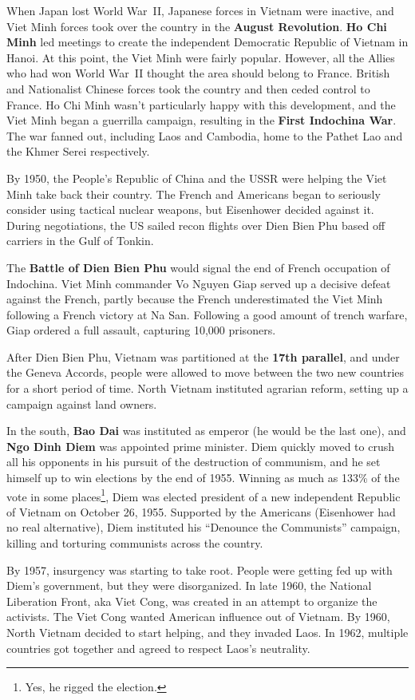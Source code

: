 When Japan lost World War~II, Japanese forces in Vietnam were inactive,
and Viet Minh forces took over the country in the \textbf{August Revolution}.
\textbf{Ho Chi Minh} led meetings to create the independent Democratic Republic of Vietnam in Hanoi.
At this point, the Viet Minh were fairly popular.
However, all the Allies who had won World War~II thought the area should belong to France.
British and Nationalist Chinese forces took the country and then ceded control to France.
Ho Chi Minh wasn't particularly happy with this development,
and the Viet Minh began a guerrilla campaign, resulting in the \textbf{First Indochina War}.
The war fanned out, including Laos and Cambodia, home to the Pathet Lao and the Khmer Serei respectively.

By 1950, the People's Republic of China and the USSR were helping the Viet Minh take back their country.
The French and Americans began to seriously consider using tactical nuclear weapons,
but Eisenhower decided against it.
During negotiations, the US sailed recon flights over Dien Bien Phu based off carriers in the Gulf of Tonkin.

The \textbf{Battle of Dien Bien Phu} would signal the end of French occupation of Indochina.
Viet Minh commander Vo Nguyen Giap served up a decisive defeat against the French,
partly because the French underestimated the Viet Minh following a French victory at Na San.
Following a good amount of trench warfare, Giap ordered a full assault, capturing 10,000 prisoners.

After Dien Bien Phu, Vietnam was partitioned at the \textbf{17th parallel},
and under the Geneva Accords, people were allowed to move between the two new countries for a short period of time.
North Vietnam instituted agrarian reform, setting up a campaign against land owners.

In the south, \textbf{Bao Dai} was instituted as emperor (he would be the last one),
and \textbf{Ngo Dinh Diem} was appointed prime minister.
Diem quickly moved to crush all his opponents in his pursuit of the destruction of communism,
and he set himself up to win elections by the end of 1955.
Winning as much as 133\% of the vote in some places\footnote{Yes, he rigged the election.},
Diem was elected president of a new independent Republic of Vietnam on October 26, 1955.
Supported by the Americans (Eisenhower had no real alternative),
Diem instituted his ``Denounce the Communists'' campaign, killing and torturing communists across the country.

By 1957, insurgency was starting to take root.
People were getting fed up with Diem's government, but they were disorganized.
In late 1960, the National Liberation Front, aka Viet Cong, was created in an attempt to organize the activists.
The Viet Cong wanted American influence out of Vietnam.
By 1960, North Vietnam decided to start helping, and they invaded Laos.
In 1962, multiple countries got together and agreed to respect Laos's neutrality.

